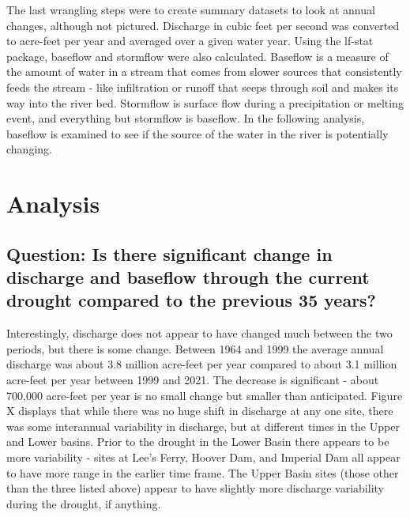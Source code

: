 \documentclass[
  12pt,
]{article}
\begin{document}
The last wrangling steps were to create summary datasets to look at
annual changes, although not pictured. Discharge in cubic feet per
second was converted to acre-feet per year and averaged over a given
water year. Using the lf-stat package, baseflow and stormflow were also
calculated. Baseflow is a measure of the amount of water in a stream
that comes from slower sources that consistently feeds the stream - like
infiltration or runoff that seeps through soil and makes its way into
the river bed. Stormflow is surface flow during a precipitation or
melting event, and everything but stormflow is baseflow. In the
following analysis, baseflow is examined to see if the source of the
water in the river is potentially changing.

\newpage

\hypertarget{analysis}{%
\section{Analysis}\label{analysis}}

\hypertarget{question-is-there-significant-change-in-discharge-and-baseflow-through-the-current-drought-compared-to-the-previous-35-years}{%
\subsection{Question: Is there significant change in discharge and
baseflow through the current drought compared to the previous 35
years?}\label{question-is-there-significant-change-in-discharge-and-baseflow-through-the-current-drought-compared-to-the-previous-35-years}}

Interestingly, discharge does not appear to have changed much between
the two periods, but there is some change. Between 1964 and 1999 the
average annual discharge was about 3.8 million acre-feet per year
compared to about 3.1 million acre-feet per year between 1999 and 2021.
The decrease is significant - about 700,000 acre-feet per year is no
small change but smaller than anticipated. Figure X displays that while
there was no huge shift in discharge at any one site, there was some
interannual variability in discharge, but at different times in the
Upper and Lower basins. Prior to the drought in the Lower Basin there
appears to be more variability - sites at Lee's Ferry, Hoover Dam, and
Imperial Dam all appear to have more range in the earlier time frame.
The Upper Basin sites (those other than the three listed above) appear
to have slightly more discharge variability during the drought, if
anything.
\end{document}
